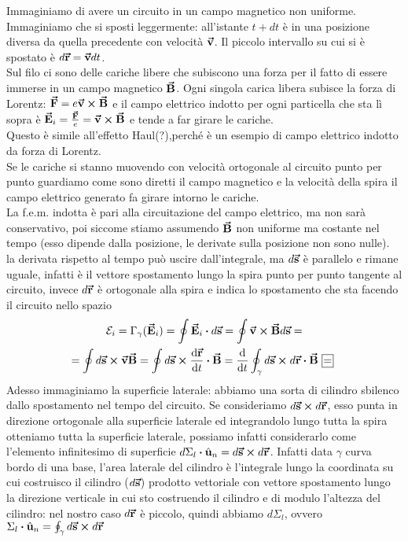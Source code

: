 \begin{demonstration}
	Immaginiamo di avere un circuito in un campo magnetico non uniforme. Immaginiamo che si sposti leggermente: all'istante $t+dt$ è in una posizione diversa da quella precedente con velocità $\vb*{\va{v}}$. Il piccolo intervallo su cui si è spostato è $d\vb*{\va{r}}=\vb*{\va{v}}dt$.\\
	Sul filo ci sono delle cariche libere che subiscono una forza per il fatto di essere immerse in un campo magnetico $\vb*{\va{B}}$. Ogni singola carica libera subisce la forza di Lorentz: $\vb*{\va{F}}=e\vb*{\va{v}}\cross\vb*{\va{B}} $ e il campo elettrico indotto per ogni particella che sta lì sopra è $\vb*{\va{E}}_i =\frac{\vb*{\va{F}}}{e}=\vb*{\va{v}}\cross\vb*{\va{B}}$ e tende a far girare le cariche.\\
	Questo è simile all'effetto Haul(?),perché è un esempio di campo elettrico indotto da forza di Lorentz.\\
	Se le cariche si stanno muovendo con velocità ortogonale al circuito	punto per punto guardiamo come sono diretti il campo magnetico e la velocità della spira	il campo elettrico generato fa girare intorno le cariche.\\
	La f.e.m. indotta è pari alla circuitazione del campo elettrico, ma non sarà conservativo, poi siccome stiamo assumendo $\vb*{\va{B}}$ non uniforme ma costante nel tempo (esso dipende dalla posizione, le derivate sulla posizione non sono nulle).\\
	la derivata rispetto al tempo può uscire dall'integrale, ma $d\vb*{\va{s}}$ è parallelo e rimane uguale, infatti è il vettore spostamento lungo la spira punto per punto tangente al circuito, invece	$d\vb*{\va{r}} $ è ortogonale alla spira e indica lo spostamento che sta facendo il circuito nello spazio	
	\begin{gather*}
		\mathcal{E}_i=\Gamma_\gamma(\vba E_i)=\oint\vba E_i\vdot d\vba s=\oint \vba v\cross\vba B d\vba s=\\
		=\oint d\vba s\cross\vba v\vba B=\oint d\vba s\cross\dv{\vba r}{t}\vdot\vba B= \dv{t}\oint_\gamma d\vba s\cross d\vba r\vdot\vba B\squarequal
	\end{gather*}
	Adesso immaginiamo la superficie laterale: abbiamo una sorta di cilindro sbilenco dallo spostamento nel tempo del circuito.
	Se consideriamo $d\vb*{\va{s}}\cross d\vb*{\va{r}}$, esso punta in direzione ortogonale alla superficie laterale ed integrandolo lungo tutta la spira otteniamo tutta la superficie laterale, possiamo infatti considerarlo come l'elemento infinitesimo di superficie $d\Sigma_l\vdot\vbh u_n=d\vba s\cross d\vba r$. Infatti data $\gamma$ curva bordo di una base, l'area laterale del cilindro è l'integrale lungo la coordinata su cui costruisco il cilindro ($d\vb*{\va{s}}$) prodotto vettoriale con vettore spostamento lungo la direzione verticale in cui sto costruendo il cilindro e di modulo l'altezza del cilindro:	nel nostro caso $d\vb*{\va{r}}$ è piccolo, quindi abbiamo $d\Sigma_l$, ovvero $\Sigma_l\vdot\vbh u_n=\oint_\gamma d\vba s\cross d\vba r$

\end{demonstration}
